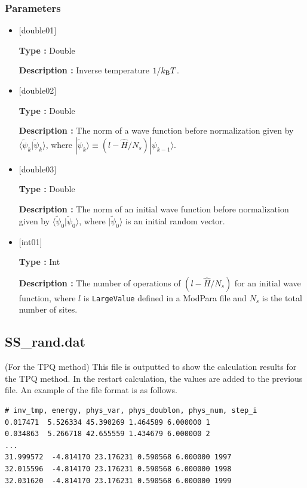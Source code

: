 \subsubsection{Parameters}
 \begin{itemize}

  \item  $[$double01$]$
  
 {\bf Type :} Double

{\bf Description :}  Inverse temperature $1/{k_{\rm B}T}$.
 
  \item $[$double02$]$

 {\bf Type :} Double 

{\bf Description :}  The norm of a wave function before normalization 
given by $\langle \tilde{\psi}_{k} |\tilde{\psi}_{k}\rangle$, where $|\tilde{\psi}_{k}\rangle \equiv(l-\hat{H}/N_{s})|\psi_{k-1}\rangle$.


  \item $[$double03$]$

 {\bf Type :} Double 

{\bf Description :} The norm of an initial wave function before normalization 
given by $\langle \tilde{\psi}_{0} |\tilde{\psi}_{0}\rangle$, where $|\tilde{\psi}_{0}\rangle$ is an initial random vector.

  \item $[$int01$]$

 {\bf Type :} Int 

{\bf Description :} The number of operations of $(l-\hat{H}/N_{s})$ for an initial wave function, where $l$ is \verb|LargeValue| defined in a ModPara file and $N_{s}$ is the total number of sites.

 \end{itemize}

\newpage
\subsection{SS\_rand.dat}
\label{Subsec:ssrand}
(For the TPQ method) This file is outputted to show the calculation results for the TPQ method.
In the restart calculation, the values are added to the previous file.
An example of the file format is as follows.\\
\begin{minipage}{15cm}
\begin{screen}
\begin{verbatim}
# inv_tmp, energy, phys_var, phys_doublon, phys_num, step_i
0.017471  5.526334 45.390269 1.464589 6.000000 1
0.034863  5.266718 42.655559 1.434679 6.000000 2
...
31.999572  -4.814170 23.176231 0.590568 6.000000 1997
32.015596  -4.814170 23.176231 0.590568 6.000000 1998
32.031620  -4.814170 23.176231 0.590568 6.000000 1999
\end{verbatim}
\end{screen}
\end{minipage}

